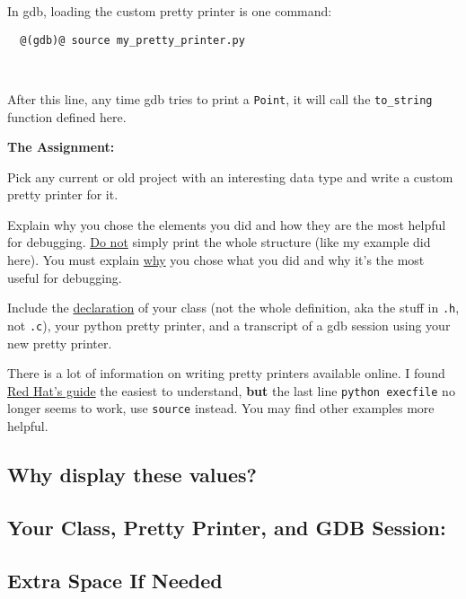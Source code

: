 \documentclass{article}
\begin{document}
In gdb, loading the custom pretty printer is one command:
\begin{lstlisting}
  @(gdb)@ source my_pretty_printer.py
\end{lstlisting}
~

After this line, any time gdb tries to print a \texttt{Point}, it will call
the \texttt{to\_string} function defined here.

\bigskip

\textbf{The Assignment:}

Pick any current or old project with an interesting data type and write a
custom pretty printer for it.

Explain why you chose the elements you did and how they are the most helpful
for debugging. \ul{Do not} simply print the whole structure (like my example
did here). You must explain \ul{why} you chose what you did and why it's the
most useful for debugging.

Include the \ul{declaration} of your class (not the whole definition, aka the
stuff in \texttt{.h}, not \texttt{.c}), your python pretty printer, and a
transcript of a gdb session using your new pretty printer.

There is a lot of information on writing pretty printers available online.
I found
\href{https://access.redhat.com/documentation/en-US/Red_Hat_Enterprise_Linux/6/html/Developer_Guide/debuggingprettyprinters.html}
{Red Hat's guide} the easiest to understand, \textbf{but} the last line
\texttt{python execfile} no longer seems to work, use \texttt{source} instead.
You may find other examples more helpful.

\newpage
\subsection*{Why display these values?}
\vspace{3cm}

\subsection*{Your Class, Pretty Printer, and GDB Session:}

\newpage
\subsection*{Extra Space If Needed}
\end{document}
